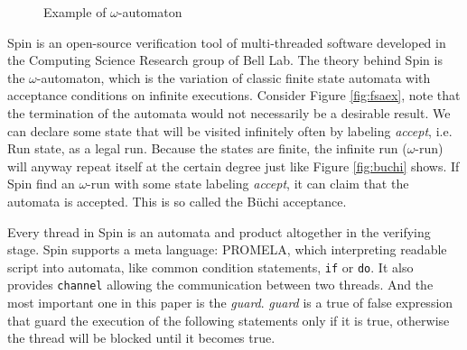 \begin{figure}
\quad
{}
\caption{Example of $\omega$-automaton}
\end{figure}
Spin \cite{SpinRoot, Ben-Ari:2008:PSM:1349767, Holzmann:2003:SMC:1405716} is an open-source verification tool of multi-threaded software developed in the Computing Science Research group of Bell Lab. The theory behind Spin is the $\omega$-automaton, which is the variation of classic finite state automata with acceptance conditions on infinite executions. Consider Figure \ref{fig:fsaex}, note that the termination of the automata would not necessarily be a desirable result. We can declare some state that will be visited infinitely often by labeling \textit{accept}, i.e. Run state, as a legal run. Because the states are finite, the infinite run ($\omega$-run) will anyway repeat itself at the certain degree just like Figure \ref{fig:buchi} shows. If Spin find an $\omega$-run with some state labeling \textit{accept}, it can claim that the automata is accepted. This is so called the B\"uchi acceptance.

Every thread in Spin is an automata and product altogether in the verifying stage. Spin supports a meta language: PROMELA, which interpreting readable script into automata, like common condition statements, \texttt{if} or \texttt{do}. It also provides \texttt{channel} allowing the communication between two threads. And the most important one in this paper is the \textit{guard}. \textit{guard} is a true of false expression that guard the execution of the following statements only if it is true, otherwise the thread will be blocked until it becomes true.

